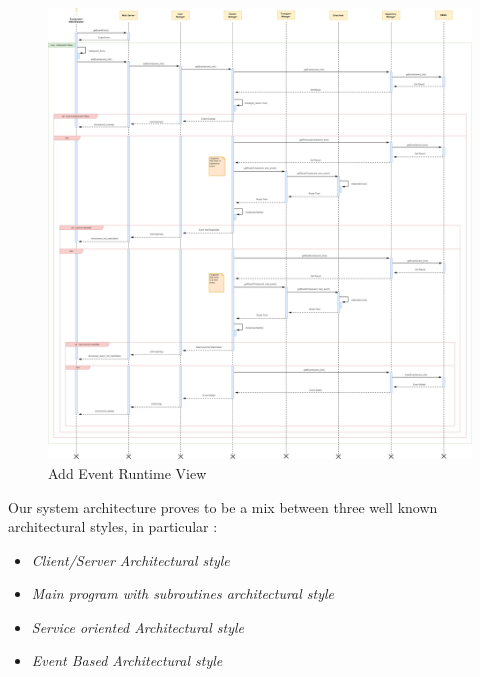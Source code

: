 \begin{figure}[H]
	\centering
	\includegraphics[scale=0.15]{Images/Runtime/Add_Event}
	\caption{Add Event Runtime View}
\end{figure}

Our system architecture proves to be a mix between three well known architectural styles, in particular : 

\begin{itemize}
\setlength{\leftskip}{0.5cm}
\item \emph{Client/Server Architectural style}
\item \emph{Main program with subroutines architectural style}
\item \emph{Service oriented Architectural style}
\item \emph{Event Based Architectural style}
\end{itemize}

